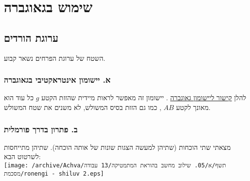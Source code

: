 
\section{שימוש  בגאוגברה}

\subsection*{ערוגת הורדים}
השטח של ערוגת הפרחים נשאר קבוע.


\subsubsection*{א. יישומון אינטראקטיבי בגאוגברה}
להלן %
\hypersetup{urlcolor=blue}%
\label{https://www.geogebra.org/classic/k7ybx9jt}%
\href{https://www.geogebra.org/classic/k7ybx9jt}{קישור ליישומון גאוגברה}%
. יישומון זה מאפשר לראות מיידית שהזזת הקטע %
$ g $ %
כל עוד הוא מאונך לקטע %
$ AB $%
, כמו גם הזזת בסיס המשולש, לא משנים את שטח המשולש.


\subsubsection*{ב. פתרון בדרך פורמלית}
מצאתי שתי הוכחות (שתיהן למעשה הצגות שונות של אותה הוכחה). שתיהן מתייחסות לשרטוט הבא:
\\[10pt]
\hspace*{50pt}
\texttt{[image: /archive/Achva/תשף/א/05. שילוב מחשב בהוראת המתמטיקה/13 עבודה מסכמת/ronengi - shiluv 2.eps]}

